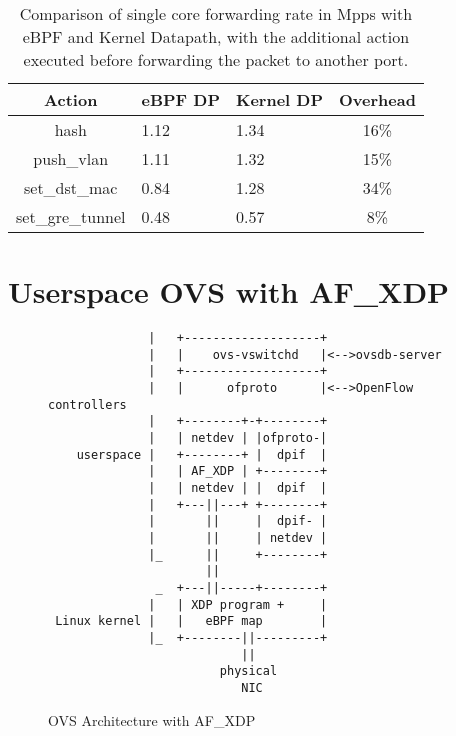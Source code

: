 \documentclass[10pt,numbers,reprint]{sigplanconf}
\begin{document}
\begin{table}
\centering
\small
\begin{tabular}{|c | p{1.4cm} | p{1.4cm}| c|}
\hline
{\bf Action} & {\bf eBPF DP} & {\bf Kernel DP} & {\bf Overhead}\\ \hline 
hash & 1.12 & 1.34 & 16\%\\ \hline
push\_vlan & 1.11 & 1.32 & 15\% \\ \hline
set\_dst\_mac & 0.84 &  1.28 & 34\% \\ \hline
set\_gre\_tunnel & 0.48 & 0.57 & 8\%\\ \hline 
\end{tabular}
\caption{\footnotesize Comparison of single core forwarding rate in Mpps
with eBPF and Kernel Datapath, with the additional
action executed before forwarding the packet to another port.}
\label{table:ebpfperf}
\end{table}

\section{Userspace OVS with AF\_XDP}
\label{sec:af_xdp}
\begin{figure}
{\scriptsize
\begin{verbatim}
              |   +-------------------+
              |   |    ovs-vswitchd   |<-->ovsdb-server
              |   +-------------------+
              |   |      ofproto      |<-->OpenFlow controllers
              |   +--------+-+--------+ 
              |   | netdev | |ofproto-|
    userspace |   +--------+ |  dpif  |
              |   | AF_XDP | +--------+
              |   | netdev | |  dpif  |
              |   +---||---+ +--------+
              |       ||     |  dpif- |
              |       ||     | netdev |
              |_      ||     +--------+  
                      ||         
               _  +---||-----+--------+
              |   | XDP program +     |
 Linux kernel |   |   eBPF map        |
              |_  +--------||---------+
                           ||
                        physical
                           NIC
\end{verbatim}
}
\vspace{-1.0em}
\caption{OVS Architecture with AF\_XDP}
\label{ovsafxdp}
\vspace{-1.0em}
\end{figure}
\end{document}
